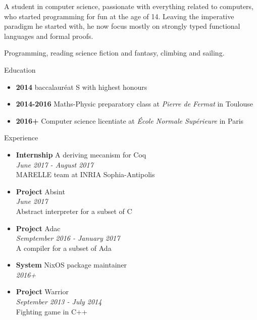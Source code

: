 \documentclass[a4paper,14pt]{extarticle}
\newcommand{\cvtitle}[1]{
    \begin{tcolorbox}[colback=bgcol,colframe=ForestGreen,
        height=1cm, valign=center, sharp corners=downhill]
        {\Large #1}
    \end{tcolorbox}
}
\begin{document}
\begin{minipage}[c]{0.35\linewidth}
\begin{tcolorbox}
        \vspace{1cm}

        A student in computer science, passionate with everything related to
        computers, who started programming for fun at the age of 14. Leaving
        the imperative paradigm he started with, he now focus mostly on
        strongly typed functional languages and formal proofs.

        \vspace{1cm}

        Programming, reading science fiction and fantasy, climbing and sailing.

    \end{tcolorbox}\end{minipage}
    \hfill
    \begin{minipage}[c][282mm][t]{0.60\linewidth}

        \cvtitle{Education}

        \begin{itemize}
            \item \textbf{2014} baccalauréat S with highest honours
            \item \textbf{2014-2016} Maths-Physic preparatory class at \emph{Pierre de Fermat} in Toulouse
            \item \textbf{2016+} Computer science licentiate at \emph{École Normale Supérieure} in Paris
        \end{itemize}

        \cvtitle{Experience}

        \begin{itemize}
            \item \textbf{Internship} A deriving mecanism for Coq \\
                \emph{June 2017 - August 2017} \\
                MARELLE team at INRIA Sophia-Antipolis
            \item \textbf{Project} Absint \\
                \emph{June 2017} \\
                Abstract interpreter for a subset of C
            \item \textbf{Project} Adac \\
                \emph{Semptember 2016 - January 2017} \\
                A compiler for a subset of Ada
            \item \textbf{System} NixOS package maintainer \\
                \emph{2016+}
            \item \textbf{Project} Warrior \\
                \emph{September 2013 - July 2014} \\
                Fighting game in C++
        \end{itemize}


\end{minipage}
\end{document}
